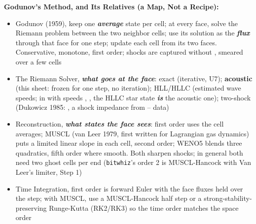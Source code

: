 \documentclass[11pt,addpoints]{exam}
\begin{document}
\begin{tcolorbox}[breakable]
\textbf{Godunov's Method, and Its Relatives (a Map, Not a Recipe):}\vspace{.5em}
\begin{itemize}
\item Godunov (1959), \hspace{3mm} keep one \textbf{\emph{average}} state per cell; at every face, solve the Riemann problem between the two neighbor cells; use its solution as the \textbf{\emph{flux}} through that face for one step; update each cell from its two faces. Conservative, monotone, first order; shocks are captured without , smeared over a few cells\vspace{.5em}
\item The Riemann Solver, \hspace{3mm} \textbf{\emph{what goes at the face}}: \hspace{2mm} exact (iterative, U7); \hspace{2mm} \textbf{acoustic} (this sheet:  frozen for one step, no iteration); \hspace{2mm} HLL/HLLC (estimated wave speeds; in  with speeds , , the HLLC star state \textbf{\emph{is}} the acoustic one); \hspace{2mm} two-shock (Dukowicz 1985: , a shock impedance from -- data)\vspace{.5em}
\item Reconstruction, \hspace{3mm} \textbf{\emph{what states the face sees}}: \hspace{2mm} first order uses the cell averages; \hspace{2mm} MUSCL (van Leer 1979, first written for Lagrangian gas dynamics) puts a limited linear slope in each cell, second order; \hspace{2mm} WENO5 blends three quadratics, fifth order where smooth. Both sharpen shocks; in general both need two ghost cells per end (\texttt{bitwhiz}'s order 2 is MUSCL-Hancock with Van Leer's limiter, Step 1)\vspace{.5em}
\item Time Integration, \hspace{3mm} first order is forward Euler with the face fluxes held over the step; with MUSCL, use a MUSCL-Hancock half step or a strong-stability-preserving Runge-Kutta (RK2/RK3) so the time order matches the space order\vspace{.5em}

\end{itemize}
\end{tcolorbox}
\end{document}

